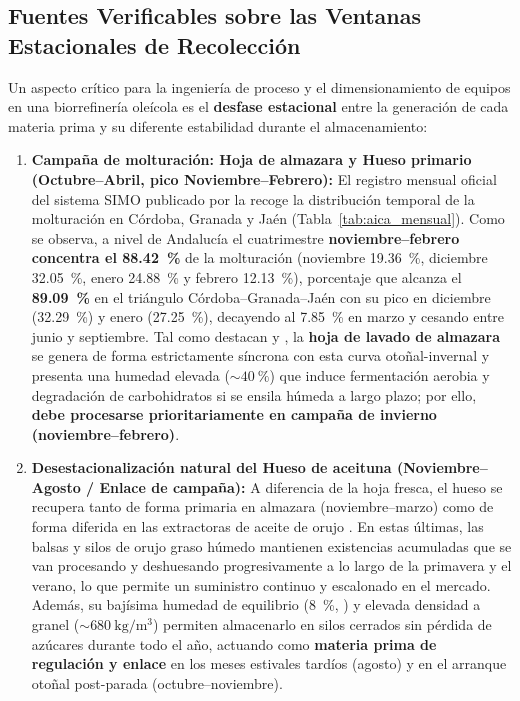 \documentclass{report}
\begin{document}
\subsection{Fuentes Verificables sobre las Ventanas Estacionales de Recolección}
Un aspecto crítico para la ingeniería de proceso y el dimensionamiento de equipos en una biorrefinería oleícola es el \textbf{desfase estacional} entre la generación de cada materia prima y su diferente estabilidad durante el almacenamiento:
\begin{enumerate}
    \item \textbf{Campaña de molturación: Hoja de almazara y Hueso primario (Octubre--Abril, pico Noviembre--Febrero):} El registro mensual oficial del sistema SIMO publicado por la \textcite{AICA2026} recoge la distribución temporal de la molturación en Córdoba, Granada y Jaén (Tabla~\ref{tab:aica_mensual}). Como se observa, a nivel de Andalucía el cuatrimestre \textbf{noviembre--febrero concentra el \SI{88.42}{\percent}} de la molturación (noviembre \SI{19.36}{\percent}, diciembre \SI{32.05}{\percent}, enero \SI{24.88}{\percent} y febrero \SI{12.13}{\percent}), porcentaje que alcanza el \textbf{\SI{89.09}{\percent}} en el triángulo Córdoba--Granada--Jaén con su pico en diciembre (\SI{32.29}{\percent}) y enero (\SI{27.25}{\percent}), decayendo al \SI{7.85}{\percent} en marzo y cesando entre junio y septiembre. Tal como destacan \textcite[Sección~2.1.1]{Jafari-Gohargan2026} y \textcite{Manzanares2017}, la \textbf{hoja de lavado de almazara} se genera de forma estrictamente síncrona con esta curva otoñal-invernal y presenta una humedad elevada ($\sim \SI{40}{\percent}$) que induce fermentación aerobia y degradación de carbohidratos si se ensila húmeda a largo plazo; por ello, \textbf{debe procesarse prioritariamente en campaña de invierno (noviembre--febrero)}.
    \item \textbf{Desestacionalización natural del Hueso de aceituna (Noviembre--Agosto / Enlace de campaña):} A diferencia de la hoja fresca, el hueso se recupera tanto de forma primaria en almazara (noviembre--marzo) como de forma diferida en las extractoras de aceite de orujo \autocite{ElFessikh2025, AICA2026}. En estas últimas, las balsas y silos de orujo graso húmedo mantienen existencias acumuladas que se van procesando y deshuesando progresivamente a lo largo de la primavera y el verano, lo que permite un suministro continuo y escalonado en el mercado. Además, su bajísima humedad de equilibrio (\SI{8}{\percent}, \textcite{RomeroGarcia2022}) y elevada densidad a granel ($\sim \SI{680}{\kilo\gram/\cubic\meter}$) permiten almacenarlo en silos cerrados sin pérdida de azúcares durante todo el año, actuando como \textbf{materia prima de regulación y enlace} en los meses estivales tardíos (agosto) y en el arranque otoñal post-parada (octubre--noviembre).

\end{enumerate}
\end{document}
